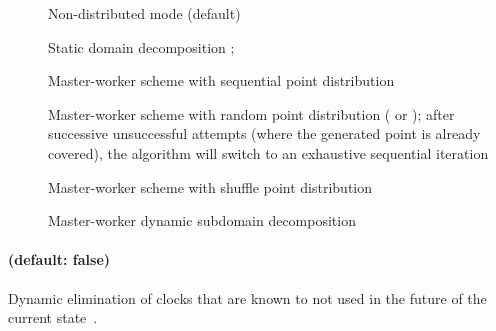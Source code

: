 \begin{description}
	\item[] Non-distributed mode (default)
	\item[] Static domain decomposition \cite{ACN15}; %
	\item[] Master-worker scheme with sequential point distribution \cite{ACE14}
	\item[] Master-worker scheme with random point distribution (\eg{}  or ); after  successive unsuccessful attempts (where the generated point is already covered), the algorithm will switch to an exhaustive sequential iteration \cite{ACE14}
	\item[] Master-worker scheme with shuffle point distribution \cite{ACN15}
	\item[] Master-worker dynamic subdomain decomposition \cite{ACN15}
\end{description}




\paragraph{ (default: false)}
Dynamic elimination of clocks that are known to not used in the future of the current state~\cite{Andre13FSFMA}.




% 



